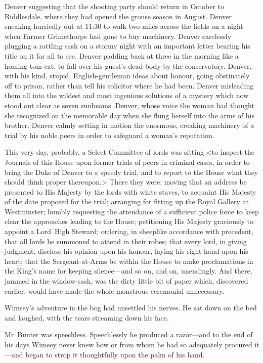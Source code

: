Denver suggesting that the shooting party should return in October to Riddlesdale, where they had opened the grouse season in August.  Denver sneaking hurriedly out at 11:30 to walk two miles across the fields on a night when Farmer Grimethorpe had gone to buy machinery.  Denver carelessly plugging a rattling sash on a stormy night with an important letter bearing his title on it for all to see. Denver padding back at three in the morning like a homing tom-cat, to fall over his guest's dead body by the conservatory. Denver, with his kind, stupid, English-gentleman ideas about honour, going obstinately off to prison, rather than tell his solicitor where he had been. Denver misleading them all into the wildest and most ingenious solutions of a mystery which now stood out clear as seven sunbeams. Denver, whose voice the woman had thought she recognized on the memorable day when she flung herself into the arms of his brother. Denver calmly setting in motion the enormous, creaking machinery of a trial by his noble peers in order to safeguard a woman's reputation.

This very day, probably, a Select Committee of lords was sitting <to inspect the Journals of this House upon former trials of peers in criminal cases, in order to bring the Duke of Denver to a speedy trial, and to report to the House what they should think proper thereupon.> There they were: moving that an address be presented to His Majesty by the lords with white staves, to acquaint His Majesty of the date proposed for the trial; arranging for fitting up the Royal Gallery at Westminster; humbly requesting the attendance of a sufficient police force to keep clear the approaches leading to the House; petitioning His Majesty graciously to appoint a Lord~High Steward; ordering, in sheeplike accordance with precedent, that all lords be summoned to attend in their robes; that every lord, in giving judgment, disclose his opinion upon his honour, laying his right hand upon his heart; that the Sergeant-at-Arms be within the House to make proclamations in the King's name for keeping silence—and so on, and on, unendingly.  And there, jammed in the window-sash, was the dirty little bit of paper which, discovered earlier, would have made the whole monstrous ceremonial unnecessary.

Wimsey's adventure in the bog had unsettled his nerves. He sat down on the bed and laughed, with the tears streaming down his face.

Mr~Bunter was speechless. Speechlessly he produced a razor—and to the end of his days Wimsey never knew how or from whom he had so adequately procured it—and began to strop it thoughtfully upon the palm of his hand.

